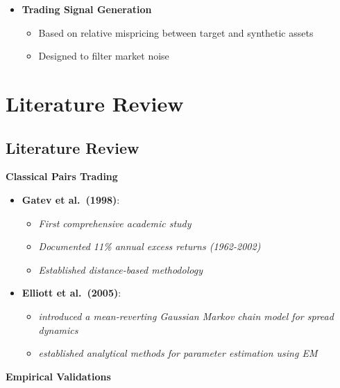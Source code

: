 \documentclass[
  letterpaper,
  DIV=11,
  numbers=noendperiod]{scrartcl}
\providecommand{\tightlist}{%
  \setlength{\itemsep}{0pt}\setlength{\parskip}{0pt}}\usepackage{longtable,booktabs,array}
\begin{document}
\begin{itemize}
\tightlist
\item
  \textbf{Trading Signal Generation}

  \begin{itemize}
  \tightlist
  \item
    Based on relative mispricing between target and synthetic assets
  \item
    Designed to filter market noise
  \end{itemize}
\end{itemize}

\section{Literature Review}\label{literature-review}

\subsection{Literature Review}\label{literature-review-1}

{\textbf{Classical Pairs Trading}}

\begin{itemize}
\tightlist
\item
  \textbf{Gatev et al.~(1998)}:

  \begin{itemize}
  \tightlist
  \item
    \emph{First comprehensive academic study}
  \item
    \emph{Documented 11\% annual excess returns (1962-2002)}
  \item
    \emph{Established distance-based methodology}
  \end{itemize}
\end{itemize}

\begin{itemize}
\tightlist
\item
  \textbf{Elliott et al.~(2005)}:

  \begin{itemize}
  \tightlist
  \item
    \emph{introduced a mean-reverting Gaussian Markov chain model for
    spread dynamics}
  \item
    \emph{established analytical methods for parameter estimation using
    EM}
  \end{itemize}
\end{itemize}

{\textbf{Empirical Validations}}
\end{document}
